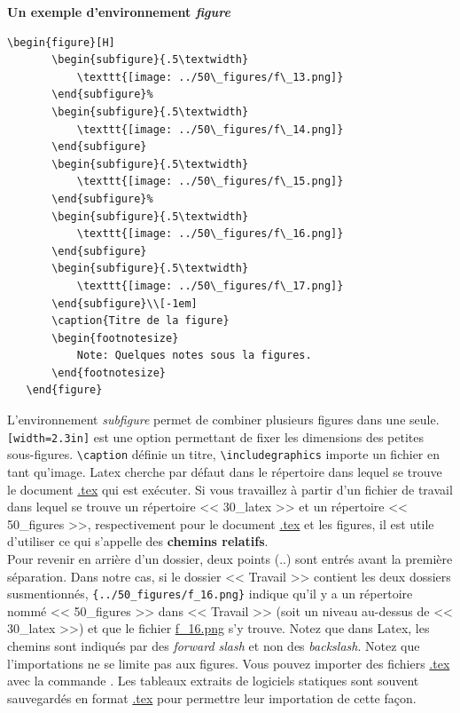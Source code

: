 \documentclass[12pt]{article}
\begin{document}
   \textbf{Un exemple d'environnement \textit{figure}} \\
   \begin{lstlisting}[frame=single]
   \begin{figure}[H]
	   \begin{subfigure}{.5\textwidth}
		   \texttt{[image: ../50\_figures/f\_13.png]} 
	   \end{subfigure}%
	   \begin{subfigure}{.5\textwidth}
		   \texttt{[image: ../50\_figures/f\_14.png]}
	   \end{subfigure}
	   \begin{subfigure}{.5\textwidth}
		   \texttt{[image: ../50\_figures/f\_15.png]}
	   \end{subfigure}%
	   \begin{subfigure}{.5\textwidth}
		   \texttt{[image: ../50\_figures/f\_16.png]}
	   \end{subfigure}
	   \begin{subfigure}{.5\textwidth}
		   \texttt{[image: ../50\_figures/f\_17.png]}
	   \end{subfigure}\\[-1em]
	   \caption{Titre de la figure}
	   \begin{footnotesize}
		   Note: Quelques notes sous la figures.
	   \end{footnotesize}
   \end{figure}
   \end{lstlisting}
   
   L'environnement \textit{subfigure} permet de combiner plusieurs figures dans une seule. \lstinline|[width=2.3in]| est une option permettant de fixer les dimensions des petites sous-figures. \lstinline|\caption| définie un titre, \lstinline|\includegraphics| importe un fichier en tant qu'image. Latex cherche par défaut dans le répertoire dans lequel se trouve le document \url{.tex} qui est exécuter. Si vous travaillez à partir d'un fichier de travail dans lequel se trouve un répertoire << 30\_latex >> et un répertoire << 50\_figures >>, respectivement pour le document \url{.tex} et les figures, il est utile d'utiliser ce qui s'appelle des \textbf{chemins relatifs}.\\
   
   Pour revenir en arrière d'un dossier, deux points (..) sont entrés avant la première séparation. Dans notre cas, si le dossier << Travail >> contient les deux dossiers susmentionnés, \lstinline|{../50_figures/f_16.png}| indique qu'il y a un répertoire nommé << 50\_figures >> dans << Travail >> (soit un niveau au-dessus de << 30\_latex >>) et que le fichier \url{f_16.png} s'y trouve. Notez que dans Latex, les chemins sont indiqués par des \textit{forward slash} et non des \textit{backslash}. Notez que l'importations ne se limite pas aux figures. Vous pouvez importer des fichiers \url{.tex} avec la commande \lstinline||. Les tableaux extraits de logiciels statiques sont souvent sauvegardés en format \url{.tex} pour permettre leur importation de cette façon. \\
   
\end{document}
